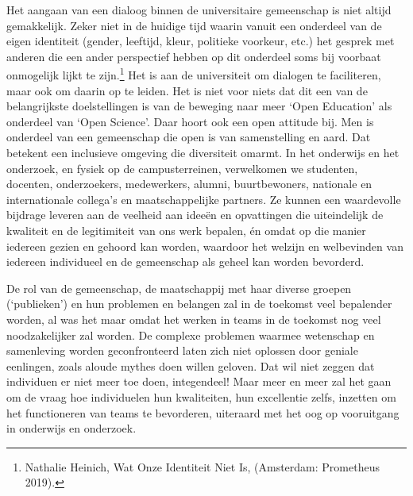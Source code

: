 \documentclass[empirical, authordate, ]{new-jote-article}
\begin{document}
	Het aangaan van een dialoog binnen de universitaire gemeenschap is niet altijd gemakkelijk. Zeker niet in de huidige tijd waarin vanuit een onderdeel van de eigen identiteit (gender, leeftijd, kleur, politieke voorkeur, etc.) het gesprek met anderen die een ander perspectief hebben op dit onderdeel soms bij voorbaat onmogelijk lijkt te zijn.\footnote{Nathalie Heinich, Wat Onze Identiteit Niet Is, (Amsterdam: Prometheus 2019).} Het is aan de universiteit om dialogen te faciliteren, maar ook om daarin op te leiden. Het is niet voor niets dat dit een van de belangrijkste doelstellingen is van de beweging naar meer ‘Open Education' als onderdeel van ‘Open Science'. Daar hoort ook een open attitude bij. Men is onderdeel van een gemeenschap die open is van samenstelling en aard. Dat betekent een inclusieve omgeving die diversiteit omarmt. In het onderwijs en het onderzoek, en fysiek op de campusterreinen, verwelkomen we studenten, docenten, onderzoekers, medewerkers, alumni, buurtbewoners, nationale en internationale collega's en maatschappelijke partners. Ze kunnen een waardevolle bijdrage leveren aan de veelheid aan ideeën en opvattingen die uiteindelijk de kwaliteit en de legitimiteit van ons werk bepalen, én omdat op die manier iedereen gezien en gehoord kan worden, waardoor het welzijn en welbevinden van iedereen individueel en de gemeenschap als geheel kan worden bevorderd.



	De rol van de gemeenschap, de maatschappij met haar diverse groepen (‘publieken') en hun problemen en belangen zal in de toekomst veel bepalender worden, al was het maar omdat het werken in teams in de toekomst nog veel noodzakelijker zal worden. De complexe problemen waarmee wetenschap en samenleving worden geconfronteerd laten zich niet oplossen door geniale eenlingen, zoals aloude mythes doen willen geloven. Dat wil niet zeggen dat individuen er niet meer toe doen, integendeel! Maar meer en meer zal het gaan om de vraag hoe individuelen hun kwaliteiten, hun excellentie zelfs, inzetten om het functioneren van teams te bevorderen, uiteraard met het oog op vooruitgang in onderwijs en onderzoek.
\end{document}
